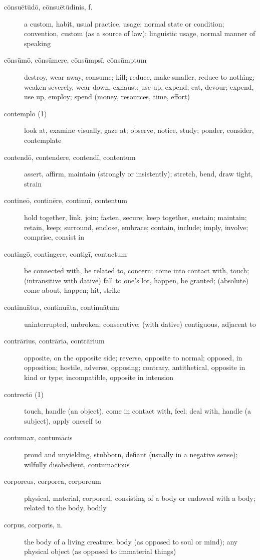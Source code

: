 \begin{description}
    \item[cōnsuētūdō, cōnsuētūdinis, f.] a custom, habit, usual practice, usage; normal state or condition; convention, custom (as a source of law); linguistic usage, normal manner of speaking
    \item[cōnsūmō, cōnsūmere, cōnsūmpsī, cōnsūmptum] \marginnote{*}destroy, wear away, consume; kill; reduce, make smaller, reduce to nothing; weaken severely, wear down, exhaust; use up, expend; eat, devour; expend, use up, employ; spend (money, resources, time, effort)
    \item[contemplō (1)] look at, examine visually, gaze at; observe, notice, study; ponder, consider, contemplate
    \item[contendō, contendere, contendī, contentum] assert, affirm, maintain (strongly or insistently); stretch, bend, draw tight, strain
    \item[contineō, continēre, continuī, contentum] hold together, link, join; fasten, secure; keep together, sustain; maintain; retain, keep; surround, enclose, embrace; contain, include; imply, involve; comprise, consist in
    \item[contingō, contingere, contigī, contactum] \marginnote{*}be connected with, be related to, concern; come into contact with, touch; (intransitive with dative) fall to one's lot, happen, be granted; (absolute) come about, happen; hit, strike
    \item[continuātus, continuāta, continuātum] uninterrupted, unbroken; consecutive; (with dative) contiguous, adjacent to
    \item[contrārius, contrāria, contrārium] opposite, on the opposite side; reverse, opposite to normal; opposed, in opposition; hostile, adverse, opposing; contrary, antithetical, opposite in kind or type; incompatible, opposite in intension
    \item[contrectō (1)] touch, handle (an object), come in contact with, feel; deal with, handle (a subject), apply oneself to
    \item[contumax, contumācis] proud and unyielding, stubborn, defiant (usually in a negative sense); wilfully disobedient, contumacious
    \item[corporeus, corporea, corporeum] \marginnote{*}physical, material, corporeal, consisting of a body or endowed with a body; related to the body, bodily
    \item[corpus, corporis, n.] \marginnote{*}the body of a living creature; body (as opposed to soul or mind); any physical object (as opposed to immaterial things)

\end{description}
